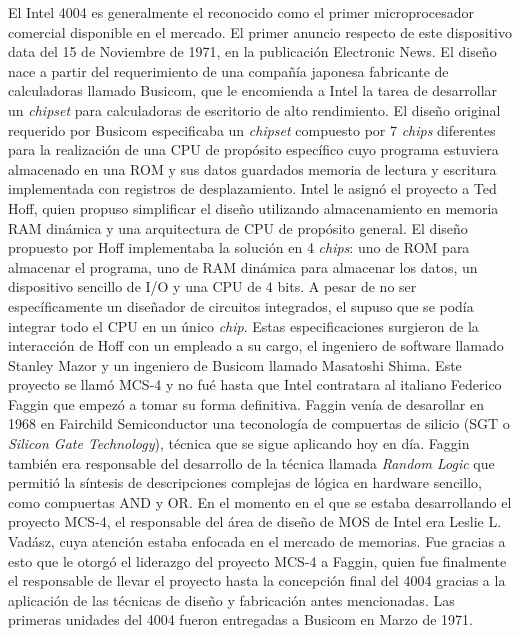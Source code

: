 El Intel 4004 es generalmente el reconocido como el primer microprocesador comercial disponible en el mercado. El primer anuncio respecto de este dispositivo data del 15 de Noviembre de 1971, en la publicación Electronic News. El diseño nace a partir del requerimiento de una compañía japonesa fabricante de calculadoras llamado Busicom, que le encomienda a Intel la tarea de desarrollar un \emph{chipset} para calculadoras de escritorio de alto rendimiento. El diseño original requerido por Busicom especificaba un \emph{chipset} compuesto por 7 \emph{chips} diferentes para la realización de una CPU de propósito específico cuyo programa estuviera almacenado en una ROM y sus datos guardados memoria de lectura y escritura implementada con registros de desplazamiento. Intel le asignó el proyecto a Ted Hoff, quien propuso simplificar el diseño utilizando almacenamiento en memoria RAM dinámica y una arquitectura de CPU de propósito general. El diseño propuesto por Hoff implementaba la solución en 4 \emph{chips}: uno de ROM para almacenar el programa, uno de RAM dinámica para almacenar los datos, un dispositivo sencillo de I/O y una CPU de 4 bits. A pesar de no ser específicamente un diseñador de circuitos integrados, el supuso que se podía integrar todo el CPU en un único \emph{chip}. Estas especificaciones surgieron de la interacción de Hoff con un empleado a su cargo, el ingeniero de software llamado Stanley Mazor y un ingeniero de Busicom llamado Masatoshi Shima. Este proyecto se llamó MCS-4 y no fué hasta que Intel contratara al italiano Federico Faggin que empezó a tomar su forma definitiva. Faggin venía de desarollar en 1968 en Fairchild Semiconductor una teconología de compuertas de silicio (SGT o \emph{Silicon Gate Technology}), técnica que se sigue aplicando hoy en día. Faggin también era responsable del desarrollo de la técnica llamada \emph{Random Logic} que permitió la síntesis de descripciones complejas de lógica en hardware sencillo, como compuertas AND y OR. En el momento en el que se estaba desarrollando el proyecto MCS-4, el responsable del área de diseño de MOS de Intel era Leslie L. Vadász, cuya atención estaba enfocada en el mercado de memorias. Fue gracias a esto que le otorgó el liderazgo del proyecto MCS-4 a Faggin, quien fue finalmente el responsable de llevar el proyecto hasta la concepción final del 4004 gracias a la aplicación de las técnicas de diseño y fabricación antes mencionadas. Las primeras unidades del 4004 fueron entregadas a Busicom en Marzo de 1971.


